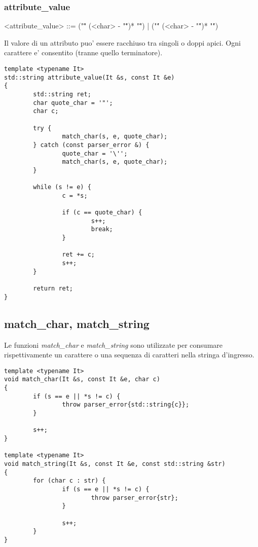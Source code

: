 \documentclass[italian,a4paper]{article}
\begin{document}
\subsubsection{attribute\_value}

\begin{grammar}
	<attribute\_value> ::= ("\"" (<char> - "\"")* "\"") | ("\'" (<char> - "\'")* "\'")
\end{grammar}

Il valore di un attributo puo' essere racchiuso tra singoli o doppi apici. Ogni
carattere e' consentito (tranne quello terminatore).

\begin{verbatim}
template <typename It>
std::string attribute_value(It &s, const It &e)
{
        std::string ret;
        char quote_char = '"';
        char c;

        try {
                match_char(s, e, quote_char);
        } catch (const parser_error &) {
                quote_char = '\'';
                match_char(s, e, quote_char);
        }

        while (s != e) {
                c = *s;

                if (c == quote_char) {
                        s++;
                        break;
                }

                ret += c;
                s++;
        }

        return ret;
}
\end{verbatim}

\subsection{match\_char, match\_string}

Le funzioni \emph{match\_char} e \emph{match\_string} sono utilizzate per
consumare rispettivamente un carattere o una sequenza di caratteri nella
stringa d'ingresso.

\begin{verbatim}
template <typename It> 
void match_char(It &s, const It &e, char c)
{
        if (s == e || *s != c) {
                throw parser_error{std::string{c}};
        }   

        s++;
}

template <typename It> 
void match_string(It &s, const It &e, const std::string &str)
{
        for (char c : str) {
                if (s == e || *s != c) {
                        throw parser_error{str};
                }   

                s++;
        }   
}
\end{verbatim}
\end{document}

